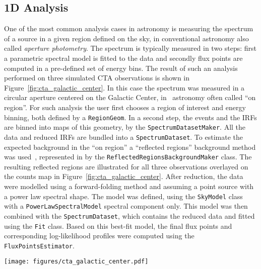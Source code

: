 \documentclass[longauth]{aa}
\newcommand{\code}[1]{\texttt{#1}}
\begin{document}
\subsection{1D Analysis}
\label{ssec:1d-analysis}
One of the most common analysis cases in \gammaray astronomy is measuring the
spectrum of a source in a given region defined on the sky, in conventional
astronomy also called \textit{aperture photometry}. The spectrum is typically measured
in two steps: first a parametric spectral model is fitted to the data and
secondly flux points are computed in a pre-defined set of energy bins. The
result of such an analysis performed on three simulated CTA observations is
shown in Figure~\ref{fig:cta_galactic_center}. In this case the spectrum was
measured in a circular aperture centered on the Galactic Center, in
\gammaray~astronomy often called \enquote{on region}. For such analysis the user first
chooses a region of interest and energy binning, both defined by a
\code{RegionGeom}. In a second step, the events and the IRFs are binned
into maps of this geometry, by the \code{SpectrumDatasetMaker}. All the data and
reduced IRFs are bundled into a \code{SpectrumDataset}. To estimate
the expected background in the \enquote{on region} a \enquote{reflected regions} background
method was used~\citep{Berge07}, represented in \gammapy by the
\code{ReflectedRegionsBackgroundMaker} class. The resulting reflected regions are
illustrated for all three observations overlayed on the counts map in Figure~\ref{fig:cta_galactic_center}.
After reduction, the data were modelled using a forward-folding method and assuming
a point source with a power law spectral shape. The model was defined, using
the \code{SkyModel} class with a \code{PowerLawSpectralModel} spectral component only.
This model was then combined with the \code{SpectrumDataset}, which contains the reduced data 
and fitted using the \code{Fit} class. Based on this best-fit model, the final flux points and corresponding
log-likelihood profiles were computed using the \code{FluxPointsEstimator}.

\begin{figure*}
	\centering
	\texttt{[image: figures/cta\_galactic\_center.pdf]}
	\caption{
		Example of a one dimensional spectral analysis of the Galactic Center for three simulated CTA
		observations from the 1DC dataset. The left image shows the maps of counts with the signal
		region in white and the reflected background regions for the three different observations
		overlaid in different colors. The right image shows the resulting spectral flux points and
		their corresponding log-likelihood profiles. The flux points are shown in orange, with the
		horizontal bar illustrating the width of the energy bin and the vertical bar the $1~\sigma$
		error. The log-likelihood profiles for each enetgy bin are shown in the background. The colormap
		illustrates the difference of the log-likelihood to the log-likelihood of the best fit value.
		}
	\label{fig:cta_galactic_center}
\end{figure*}
\end{document}
